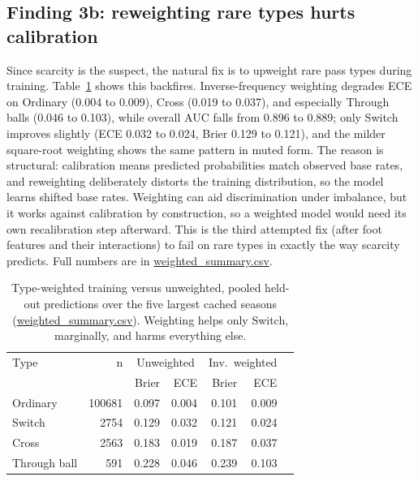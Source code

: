 \documentclass[11pt,a4paper]{article}
\begin{document}
\subsection{Finding 3b: reweighting rare types hurts calibration}
Since scarcity is the suspect, the natural fix is to upweight rare pass
types during training. Table~\ref{tab:weight} shows this backfires.
Inverse-frequency weighting degrades ECE on Ordinary (0.004 to 0.009),
Cross (0.019 to 0.037), and especially Through balls (0.046 to 0.103),
while overall AUC falls from 0.896 to 0.889; only Switch improves
slightly (ECE 0.032 to 0.024, Brier 0.129 to 0.121), and the milder
square-root weighting shows the same pattern in muted form. The reason is
structural: calibration means predicted probabilities match observed base
rates, and reweighting deliberately distorts the training distribution,
so the model learns shifted base rates. Weighting can aid discrimination
under imbalance, but it works against calibration by construction, so a
weighted model would need its own recalibration step afterward. This is
the third attempted fix (after foot features and their interactions) to
fail on rare types in exactly the way scarcity predicts. Full numbers are
in \url{weighted_summary.csv}.
\begin{table}[h]
\centering
\begin{tabular}{lrrrrrr}
\toprule
Type & n & \multicolumn{2}{c}{Unweighted} & \multicolumn{2}{c}{Inv.\ weighted} \\
 & & Brier & ECE & Brier & ECE \\
\midrule
Ordinary & 100681 & 0.097 & 0.004 & 0.101 & 0.009 \\
Switch & 2754 & 0.129 & 0.032 & 0.121 & 0.024 \\
Cross & 2563 & 0.183 & 0.019 & 0.187 & 0.037 \\
Through ball & 591 & 0.228 & 0.046 & 0.239 & 0.103 \\
\bottomrule
\end{tabular}
\caption{Type-weighted training versus unweighted, pooled held-out
predictions over the five largest cached seasons
(\url{weighted_summary.csv}). Weighting helps only Switch, marginally,
and harms everything else.}
\label{tab:weight}
\end{table}
\end{document}
